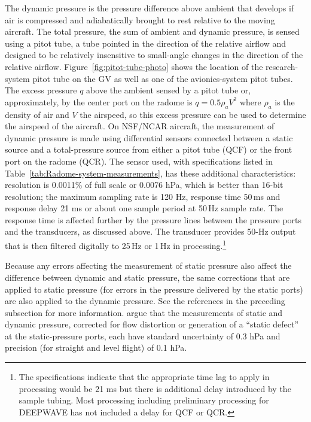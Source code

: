 \documentclass[12pt,twoside,english]{article}\usepackage[]{graphicx}\usepackage[]{color}
\let\OrgIndex\index
\renewcommand*{\index}[1]{\OrgIndex{#1}}
\providecommand{\DIFadd}[1]{{\protect\color{blue}\uwave{#1}}} %
\providecommand{\DIFaddbegin}{} %
\providecommand{\DIFaddend}{} %
\begin{document}
{The dynamic pressure is the pressure difference above ambient that develops if air is compressed and adiabatically brought to rest relative to the moving aircraft. The total pressure, the sum of ambient and dynamic pressure, is sensed using a pitot tube, a tube pointed in the direction of the relative airflow and designed to be relatively insensitive to small-angle changes in the direction of the relative airflow. Figure~\ref{fig:pitot-tube-photo} shows the location of the research-system pitot tube on the GV as well as one of the avionics-system pitot tubes. The excess pressure $q$ above the ambient sensed by a pitot tube or, approximately, by the center port on the radome is $q=0.5\rho_{a}V^{2}$ where $\rho_{a}$ is the density of \DIFaddbegin \DIFadd{the ambient }\DIFaddend air and $V$ the airspeed, so this excess pressure can be used to determine the airspeed of the aircraft. On NSF/NCAR aircraft, the measurement of dynamic pressure is made using differential sensors connected between a static source and a total-pressure source from either a pitot tube (QCF) or the front port on the radome (QCR). The sensor used, with specifications listed in Table~\ref{tab:Radome-system-measurements}, has these additional characteristics: resolution is 0.0011\% of full scale or 0.0076 hPa, which is better than 16-bit resolution; the maximum sampling rate is 120 Hz, response time 50\,ms and response delay 21 ms or about one sample period at 50\,Hz sample rate. The response time is affected further by the pressure lines between the pressure ports and the transducers, as discussed above. The transducer provides 50-Hz output that is then filtered digitally to 25\,Hz or 1\,Hz in processing.\footnote{The specifications indicate that the appropriate time lag to apply in processing would be 21 ms but there is additional delay introduced by the sample tubing. Most processing including preliminary processing for DEEPWAVE has not included a delay for QCF or QCR.} 

Because any errors affecting the measurement of static pressure also affect the difference between dynamic and static pressure, the same corrections that are applied to static pressure (for errors in the pressure delivered by the static ports) are also applied to the dynamic pressure. See the references in the preceding subsection for more information. \citet{CooperEtAl2014} argue that the measurements of static and dynamic pressure, corrected for flow distortion or generation of a ``static defect'' at the static-pressure ports, each have standard uncertainty of 0.3 hPa and precision (for straight and level flight) of 0.1 hPa. 

}
\end{document}
